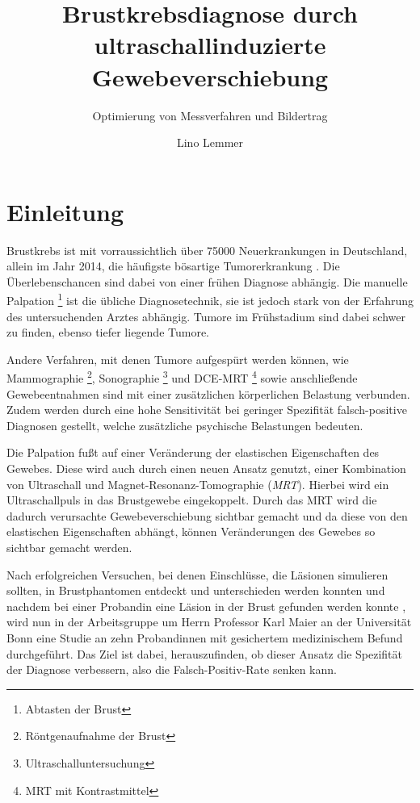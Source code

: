 \documentclass[
    11pt,
    ngerman
]{scrreprt}
\author{Lino Lemmer}
\title{Brustkrebsdiagnose durch ultraschallinduzierte Gewebeverschiebung}
\subtitle{Optimierung von Messverfahren und Bildertrag}
\begin{document}
\maketitle


\tableofcontents

\chapter{Einleitung}

Brustkrebs ist mit vorraussichtlich über 75000 Neuerkrankungen in Deutschland,
allein im Jahr 2014, die häufigste bösartige Tumorerkrankung
\parencite[68]{krebs_in_deutschland}. Die Überlebenschancen sind dabei von
einer frühen Diagnose abhängig. Die manuelle Palpation \footnote{Abtasten der
Brust} ist die übliche Diagnosetechnik, sie ist jedoch stark von der Erfahrung
des untersuchenden Arztes abhängig. Tumore im Frühstadium sind dabei schwer zu
finden, ebenso tiefer liegende Tumore.

Andere Verfahren, mit denen Tumore aufgespürt werden können, wie Mammographie
\footnote{Röntgenaufnahme der Brust}, Sonographie
\footnote{Ultraschalluntersuchung} und DCE-MRT \footnote{MRT mit
Kontrastmittel} sowie anschließende Gewebeentnahmen sind mit einer zusätzlichen
körperlichen Belastung verbunden. Zudem werden durch eine hohe Sensitivität bei
geringer Spezifität falsch-positive Diagnosen gestellt, welche zusätzliche
psychische Belastungen bedeuten.

Die Palpation fußt auf einer Veränderung der elastischen Eigenschaften des
Gewebes.
Diese wird auch durch einen neuen Ansatz genutzt, einer Kombination
von Ultraschall und Magnet-Resonanz-Tomographie (\emph{MRT}). Hierbei wird ein
Ultraschallpuls in das Brustgewebe eingekoppelt. Durch das MRT wird die dadurch
verursachte Gewebeverschiebung sichtbar gemacht und da diese von den
elastischen Eigenschaften abhängt, können Veränderungen des Gewebes so sichtbar
gemacht werden.

Nach erfolgreichen Versuchen, bei denen Einschlüsse, die Läsionen simulieren
sollten, in Brustphantomen entdeckt und unterschieden werden konnten
\parencite{dipl_ulucay} und nachdem bei einer Probandin eine Läsion in der
Brust gefunden werden konnte \parencite{diss_mende}, wird nun in der
Arbeitsgruppe um Herrn Professor Karl Maier an der Universität Bonn eine Studie
an zehn Probandinnen mit gesichertem medizinischem Befund durchgeführt. Das
Ziel ist dabei, herauszufinden, ob dieser Ansatz die Spezifität der Diagnose
verbessern, also die Falsch-Positiv-Rate senken kann.
\end{document}
